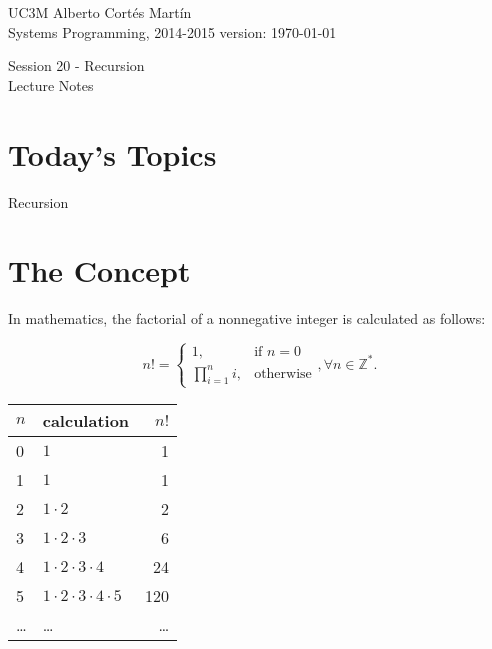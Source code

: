 \documentclass[a4paper, 9pt]{extarticle}
\newcommand{\realtitle}{Session 20 - Recursion}
\begin{document}
\makebox[\linewidth]{\rule{\textwidth}{0.4pt}}
UC3M \hfill Alberto Cortés Martín\\
Systems Programming, 2014-2015 \hfill version: \today\\
\makebox[\linewidth]{\rule{\textwidth}{0.4pt}}
\begin{center}
  \Large{\realtitle}\\Lecture Notes
\end{center}
\makebox[\linewidth]{\rule{\textwidth}{0.4pt}}
\vspace{1cm}


\section{Today's Topics}
\begin{blackboard}
Recursion
\end{blackboard}


\section{The Concept}

In mathematics, the factorial of a nonnegative integer is calculated as follows:

\begin{multicols}{2}
\begin{equation*}
  n! =
  \begin{cases}
    1, & \text{if } n = 0\\
    \prod_{i=1}^{n}i, & \text{otherwise}
  \end{cases}, \forall n \in \mathbb{Z}^{*}.
\end{equation*}

\columnbreak

\begin{center}
  \begin{tabular}{|l|l|r|}
    \hline
    $n$ & calculation & $n!$\\
    \hline
    0   & $1$          & 1 \\
    1   & $1$          & 1 \\
    2   & $1 \cdot 2$ & 2 \\
    3   & $1 \cdot 2 \cdot 3$ & 6 \\
    4   & $1 \cdot 2 \cdot 3 \cdot 4$ & 24 \\
    5   & $1 \cdot 2 \cdot 3 \cdot 4 \cdot 5$ & 120 \\
    \ldots & \ldots & \ldots \\
    \hline
  \end{tabular}
\end{center}
\end{multicols}
\end{document}
